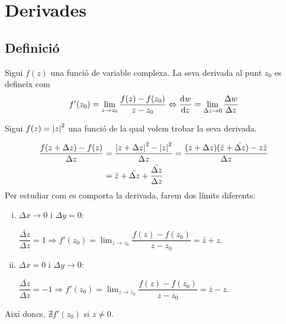 \section{Derivades}
\subsection{Definició}
\begin{defi}
    Sigui $f(z)$ una funció de variable complexa. La seva derivada al punt $z_{0}$ es defineix com
    \begin{align}
        f'(z_{0}) = \lim_{z \to z_{0}} \frac{f(z) - f(z_{0})}{z - z_{0}} \Leftrightarrow \frac{\mathrm{d}^{}w}{\mathrm{d} z^{}} = \lim_{\Delta z \to 0} \frac{\Delta w}{\Delta z}
    \end{align}
\end{defi}

\begin{example}\label{ex:absz2}
    Sigui $f(z) = \left| z \right|^{2}$ una funció de la qual volem trobar la seva derivada.
    
    \begin{align*}
    \begin{aligned}
        \dfrac{f(z + \Delta z) - f(z)}{\Delta z} &= \dfrac{\left| z + \Delta z \right|^{2} - \left| z \right|^{2}}{\Delta z} = \dfrac{(z + \Delta z) (\bar{z} + \bar{\Delta z}) - z \bar{z}}{\Delta z} \\
        &= \bar{z} + \bar{\Delta z} + \dfrac{\bar{\Delta z}}{\Delta z}
    \end{aligned}
    \end{align*}
    Per estudiar com es comporta la derivada, farem dos límits diferents:
    \begin{enumerate}[i)]
        \item $\Delta x \to 0$ i $\Delta y = 0$: 
        
        $\dfrac{\bar{\Delta z}}{\Delta z} = 1 \Rightarrow f'(z_{0}) = \lim_{z \to z_{0}} \dfrac{f(z) - f(z_{0})}{z - z_{0}} = \bar{z} + z$.
        \item $\Delta x = 0$ i $\Delta y \to 0$: 
        
        $\dfrac{\bar{\Delta z}}{\Delta z} = -1 \Rightarrow f'(z_{0}) = \lim_{z \to z_{0}} \dfrac{f(z) - f(z_{0})}{z - z_{0}} = \bar{z} - z$.
    \end{enumerate}
    Així doncs, $\nexists f'(z_{0})$ si $z \neq 0$.
\end{example}

